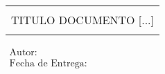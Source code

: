 {\begin{titlepage}

\begin{table}[h!]
    \centering
    \begin{tabular}{c}\\\hline
    \\
    \Huge TITULO DOCUMENTO [...]\\ 
     \\\hline 
    \end{tabular} 
    \label{tab:my_label}
\end{table} 
$\begin{array}{l}
    \text{Autor:}  \\
    \text{Fecha de Entrega: } \\
\end{array}$

\end{titlepage}}
